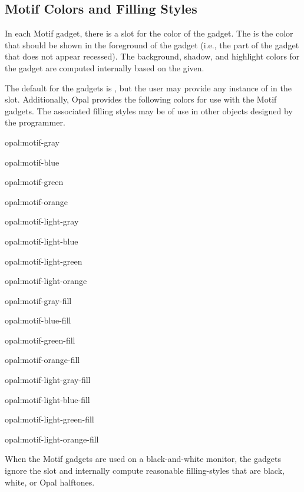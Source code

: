 \subsection{Motif Colors and Filling Styles}

In each Motif gadget, there is a slot for the color of the gadget.
The  is the color that should be shown in the foreground
of the gadget (i.e., the part of the gadget that does not appear recessed).
The background, shadow, and highlight colors for the gadget are computed
internally based on the  given.

\vspace{1 line}
\begin{group}
The default  for the gadgets is ,
but the user may provide any instance of  in the slot.
Additionally, Opal provides the following colors for use
with the Motif gadgets.  The associated filling styles may be of use in other
objects designed by the programmer.

\vspace{1 line}
\begin{text}
opal:motif-gray

opal:motif-blue

opal:motif-green

opal:motif-orange

opal:motif-light-gray

opal:motif-light-blue

opal:motif-light-green

opal:motif-light-orange

opal:motif-gray-fill

opal:motif-blue-fill

opal:motif-green-fill

opal:motif-orange-fill

opal:motif-light-gray-fill

opal:motif-light-blue-fill

opal:motif-light-green-fill

opal:motif-light-orange-fill
\end{text}
\end{group}
\vspace{1 line}

When the Motif gadgets are used on a black-and-white monitor, the gadgets
ignore the  slot and internally compute reasonable
filling-styles that are black, white, or Opal halftones.


